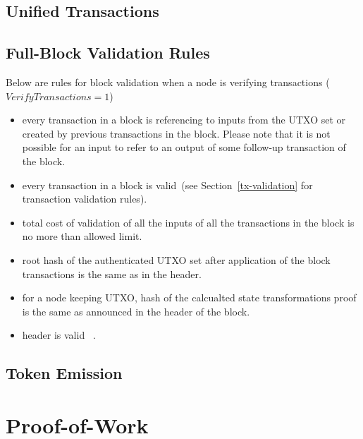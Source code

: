 \documentclass[]{article}   %
\newcommand{\authnote}[2]{\marginpar{\parbox{\marginparwidth}{\tiny %
  \textsf{#1 {\textcolor{blue}{notes: #2}}}}}%
  \textcolor{blue}{\textbf{\dag}}}
\newcommand{\authnote}[2]{
  \textsf{#1 \textcolor{blue}{: #2}}}
\newcommand{\authnote}[2]{}
\newcommand{\knote}[1]{{\authnote{\textcolor{green}{Alex notes}}{#1}}}
\begin{document}
\subsection{Unified Transactions}

\knote{Write about fee as boxes and absence of out-of-thin-air emission in the "coinbase" transaction.}

\subsection{Full-Block Validation Rules}

Below are rules for block validation when a node is verifying transactions ($VerifyTransactions = 1$)

\begin{itemize}
    \item{} every transaction in a block is referencing to inputs from the UTXO set or created by previous transactions
    in the block. Please note that it is not possible for an input to refer to an output of some follow-up transaction
    of the block.
    \item{} every transaction in a block is valid~(see Section~\ref{tx-validation} for transaction validation rules).
    \item{} total cost of validation of all the inputs of all the transactions in the block is no more than
    allowed limit.
    \item{} root hash of the authenticated UTXO set after application of the block transactions is the same as
    in the header.
    \item{} for a node keeping UTXO, hash of the calcualted state transformations proof is the same as announced
    in the header of the block.
    \item{} header is valid~\knote{link to header validation rules}.
\end{itemize}

\knote{mention emission rules. extractEmissionBox is buggy probably.}
\knote{extension validation rules}

\subsection{Token Emission}





\section{Proof-of-Work}
\end{document}

